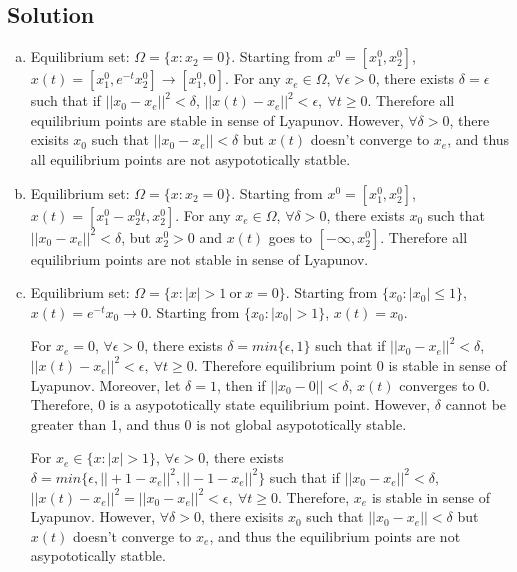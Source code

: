 \documentclass[11pt]{report}
\theoremstyle{definition}
\begin{document}
\subsection*{Solution}
\begin{enumerate}[(a), noitemsep]
\item
Equilibrium set: $\Omega = \{x: x_2=0\}$. Starting from $x^0 = [x_1^0, x_2^0]$, $x(t) = [x_1^0, e^{-t} x_2^0] \to [x_1^0, 0]$. For any $x_e \in \Omega$, $\forall \epsilon > 0$, there exists $\delta = \epsilon$ such that if $||x_0 - x_e||^2 < \delta$, $||x(t) - x_e||^2 < \epsilon,~\forall t \geq 0$. Therefore all equilibrium points are stable in sense of Lyapunov. However, $\forall \delta > 0$, there exisits $x_0$ such that $||x_0 - x_e|| < \delta$ but $x(t)$ doesn't converge to $x_e$, and thus all equilibrium points are not asypototically statble.
\item
Equilibrium set: $\Omega = \{x: x_2=0\}$. Starting from $x^0 = [x_1^0, x_2^0]$, $x(t) = [x_1^0 - x_2^0 t, x_2^0]$. For any $x_e \in \Omega$, $\forall \delta > 0$, there exists $x_0$ such that $||x_0 - x_e||^2 < \delta$, but $x_2^0 > 0$ and $x(t)$ goes to $[-\infty, x_2^0]$. Therefore all equilibrium points are not stable in sense of Lyapunov.
\item
Equilibrium set: $\Omega = \{x: |x| > 1~\text{or}~x = 0\}$. Starting from $\{x_0: |x_0| \leq 1\}$, $x(t) = e^{-t} x_0 \to 0$. Starting from $\{x_0: |x_0| > 1\}$, $x(t) = x_0$.

For $x_e = 0$, $\forall \epsilon > 0$, there exists $\delta = min\{\epsilon, 1\}$ such that if $||x_0 - x_e||^2 < \delta$, $||x(t) - x_e||^2 < \epsilon,~\forall t \geq 0$. Therefore equilibrium point 0 is stable in sense of Lyapunov. Moreover, let $\delta = 1$, then if $||x_0 - 0|| < \delta$, $x(t)$ converges to 0. Therefore, 0 is a asypototically state equilibrium point. However, $\delta$ cannot be greater than 1, and thus 0 is not global asypototically stable.

For $x_e \in \{x: |x| > 1\}$, $\forall \epsilon > 0$, there exists $\delta = min\{\epsilon, ||+1-x_e||^2, ||-1-x_e||^2\}$ such that if $||x_0 - x_e||^2 < \delta$, $||x(t) - x_e||^2 = ||x_0 - x_e||^2 < \epsilon,~\forall t \geq 0$. Therefore, $x_e$ is stable in sense of Lyapunov. However, $\forall \delta > 0$, there exisits $x_0$ such that $||x_0 - x_e|| < \delta$ but $x(t)$ doesn't converge to $x_e$, and thus the equilibrium points are not asypototically statble.
\end{enumerate}

\end{document}
